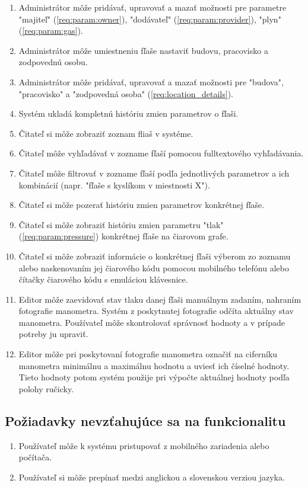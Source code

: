 \documentclass{zah}
\begin{document}
\begin{enumerate}
\item Administrátor môže pridávať, upravovať a mazať možnosti pre parametre "majiteľ" (\ref{req:param:owner}), "dodávateľ" (\ref{req:param:provider}), "plyn" (\ref{req:param:gas}).
\item \label{req:location_details} Administrátor môže umiestneniu fľaše nastaviť budovu, pracovisko a zodpovednú osobu.
\item Administrátor môže pridávať, upravovať a mazať možnosti pre "budova", "pracovisko" a "zodpovedná osoba" (\ref{req:location_details}).
\item \label{req:history} Systém ukladá kompletnú históriu zmien parametrov o fľaši.
\item Čitateľ si môže zobraziť zoznam fliaš v systéme.
\item Čitateľ môže vyhľadávať v zozname fľaší pomocou fulltextového vyhľadávania.
\item Čitateľ môže filtrovať v zozname fľaší podľa jednotlivých parametrov a ich kombinácií (napr. "fľaše s kyslíkom v miestnosti X").
\item Čitateľ si môže pozerať históriu zmien parametrov konkrétnej fľaše.
\item Čitateľ si môže zobraziť históriu zmien parametru "tlak" (\ref{req:param:pressure}) konkrétnej fľaše na čiarovom grafe.
\item Čitateľ si môže zobraziť informácie o konkrétnej fľaši výberom zo zoznamu alebo naskenovaním jej čiarového kódu pomocou mobilného telefónu alebo čítačky čiarového kódu s emuláciou klávesnice.
\item Editor môže zaevidovať stav tlaku danej fľaši manuálnym zadaním, nahraním fotografie manometra.
Systém z poskytnutej fotografie odčíta aktuálny stav manometra. Používateľ môže skontrolovať správnosť hodnoty a v prípade potreby ju upraviť.
\item Editor môže pri poskytovaní fotografie manometra označiť na ciferníku manometra minimálnu a maximálnu hodnotu a uviesť ich číselné hodnoty. Tieto hodnoty potom systém použije pri výpočte aktuálnej hodnoty podľa polohy ručicky.
\end{enumerate}

\subsection{Požiadavky nevzťahujúce sa na funkcionalitu}

\begin{enumerate}
\item Používateľ môže k systému pristupovať z mobilného zariadenia alebo počítača.
\item Používateľ si môže prepínať medzi anglickou a slovenskou verziou jazyka.
\end{enumerate}


\end{document}
